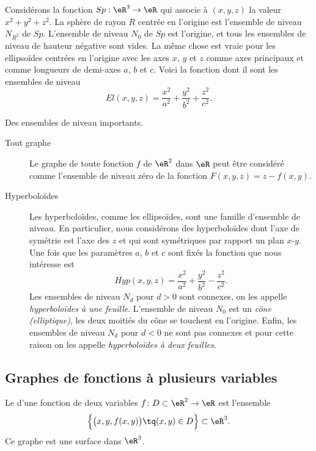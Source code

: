 Considérons la fonction \( Sp: \eR^3\to \eR\) qui associe à \( (x,y,z)\) la valeur \( x^2+y^2+z^2\). La sphère de rayon \( R\) centrée en l'origine est l'ensemble de niveau \( N_{R^2}\) de \( Sp\). L'ensemble de niveau \( N_{0}\) de \( Sp\) est l'origine, et tous les ensembles de niveau de hauteur négative sont vides. La même chose est vraie pour les ellipsoïdes centrées en l'origine avec les axes \( x\), \( y\) et \( z\) comme axes principaux et comme longueurs de demi-axes \( a\), \( b\) et \( c\). Voici la fonction dont il sont les ensembles de niveau
\[
	El(x,y,z)= \frac{x^2}{a^2}+\frac{y^2}{b^2}+\frac{z^2}{c^2}.
\]
\begin{example}
	Des ensembles de niveau importants.
	\begin{description}
		\item[Tout graphe]
		      Le graphe de toute fonction \( f\)  de \( \eR^2\) dans \( \eR\) peut être considéré comme l'ensemble de niveau zéro de la fonction \( F(x,y,z)=z-f(x,y)\).

		\item[Hyperboloïdes]
		      Les hyperboloïdes, comme les ellipsoïdes, sont une famille d'ensemble de niveau. En particulier, nous considérons des hyperboloïdes dont l'axe de symétrie est l'axe des \( z\) et qui sont symétriques par rapport un plan \( x\)-\( y\).  Une fois que les paramètres  \( a\), \( b\) et \( c\) sont fixés la fonction que nous intéresse est
		      \[
			      Hyp(x,y,z)= \frac{x^2}{a^2}+\frac{y^2}{b^2}-\frac{z^2}{c^2}.
		      \]
		      Les ensembles de niveau \( N_d\) pour \( d>0\) sont connexes, on les appelle \emph{hyperboloïdes à une feuille}. L'ensemble de niveau \( N_0\) est un \emph{cône (elliptique)}, les deux moitiés du cône se touchent en l'origine. Enfin, les ensembles de niveau \( N_d\) pour \( d<0\) ne sont  pas connexes et pour cette raison on les appelle \emph{hyperboloïdes à deux feuilles}.
	\end{description}
\end{example}

\subsection{Graphes de fonctions à plusieurs variables}

Le  d'une fonction de deux variables \( f\colon D\subset\eR^2\to \eR\) est l'ensemble
\begin{equation}
	\Big\{   \big( x,y,f(x,y) \big) \tq (x,y)\in D \Big\}\subset\eR^3.
\end{equation}
Ce graphe est une surface dans \( \eR^3\).

